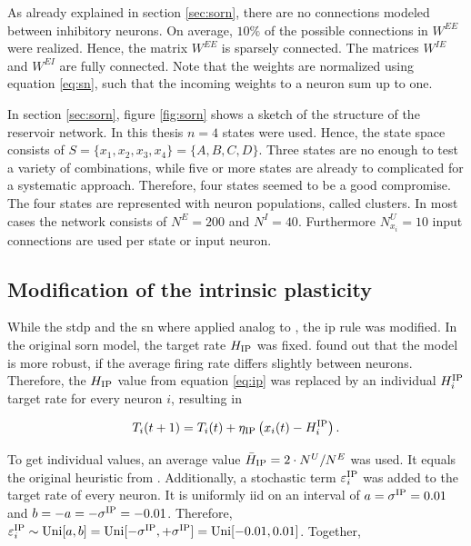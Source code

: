 As already explained in section \ref{sec:sorn}, there are no connections modeled between inhibitory neurons. On average, $10\%$ of the possible connections in $W^{EE}$ were realized. Hence, the matrix $W^{EE}$ is sparsely connected. The matrices $W^{IE}$ and $W^{EI}$ are fully connected. Note that the weights are normalized using equation \eqref{eq:sn}, such that the incoming weights to a neuron sum up to one.

In section \ref{sec:sorn}, figure \ref{fig:sorn} shows a sketch of the structure of the reservoir network. In this thesis $n = 4$ states were used. Hence, the state space consists of $S = \{x_1, x_2, x_3, x_4\} = \{A, B, C, D\}$. Three states are no enough to test a variety of combinations, while five or more states are already to complicated for a systematic approach. Therefore, four states seemed to be a good compromise. The four states are represented with neuron populations, called clusters. In most cases the network consists of $N^E = 200$ and $N^I = 40$. Furthermore $N_{x_i}^U = 10$ input connections are used per state or input neuron.

\subsection{Modification of the intrinsic plasticity}
\label{sec:ip-mod}

While the \acs{stdp} and the \acs{sn} where applied analog to \textcite{lazar2009sorn}, the \acs{ip} rule was modified. In the original \acs{sorn} model, the target rate $H_{\text{IP}}$ was fixed. \textcite{hartmann2015s} found out that the model is more robust, if the average firing rate differs slightly between neurons. Therefore, the $H_{\text{IP}}$ value from equation \eqref{eq:ip} was replaced by an individual $H_i^{\text{IP}}$ target rate for every neuron $i$, resulting in

\begin{equation}
\label{eq:ip-ind}
T_i(t+1) = T_i(t) + \eta_{\text{IP}} \left( x_i(t) - H_i^{\text{IP}} \right).
\end{equation}

To get individual values, an average value $\bar H_{\text{IP}} = 2\cdot N^U/N^E$ was used. It equals the original heuristic from \textcite{lazar2009sorn}. Additionally, a stochastic term $\varepsilon_i^{\text{IP}}$ was added to the target rate of every neuron. It is uniformly \acs{iid} on an interval of $a = \sigma^{\text{IP}} = 0.01$ and $b = -a = -\sigma^{\text{IP}} = -0.01$. Therefore, $\varepsilon_i^{\text{IP}} \sim \text{Uni}[a,b] = \text{Uni}[-\sigma^{\text{IP}},+\sigma^{\text{IP}}] = \text{Uni}[-0.01,0.01]$. Together,

